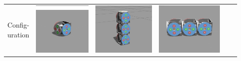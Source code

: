 \documentclass{standalone}
\newcommand{\picHeight}{1in}
\begin{document}
        \begin{tabular}{| c | c | c | c | c | c |}
            \hline
            \pbox{20cm}{Config-\\uration} &
            \includegraphics[height=\picHeight]{driver1.png} &
            \includegraphics[height=\picHeight]{leg3.png} &
            \includegraphics[height=\picHeight]{body3.png} &

\end{tabular}
\end{document}
